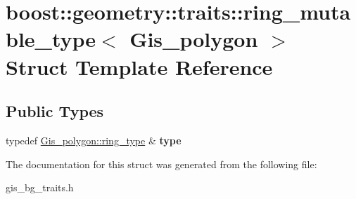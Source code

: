 \hypertarget{structboost_1_1geometry_1_1traits_1_1ring__mutable__type_3_01Gis__polygon_01_4}{}\section{boost\+:\+:geometry\+:\+:traits\+:\+:ring\+\_\+mutable\+\_\+type$<$ Gis\+\_\+polygon $>$ Struct Template Reference}
\label{structboost_1_1geometry_1_1traits_1_1ring__mutable__type_3_01Gis__polygon_01_4}
\subsection*{Public Types}
\begin{DoxyCompactItemize}
\item 
\mbox{\label{structboost_1_1geometry_1_1traits_1_1ring__mutable__type_3_01Gis__polygon_01_4_aac441e4ccb47684166a05a41d22f74b7}} 
typedef \mbox{\hyperlink{classGis__polygon__ring}{Gis\+\_\+polygon\+::ring\+\_\+type}} \& {\bfseries type}
\end{DoxyCompactItemize}


The documentation for this struct was generated from the following file\+:\begin{DoxyCompactItemize}
\item 
gis\+\_\+bg\+\_\+traits.\+h\end{DoxyCompactItemize}
